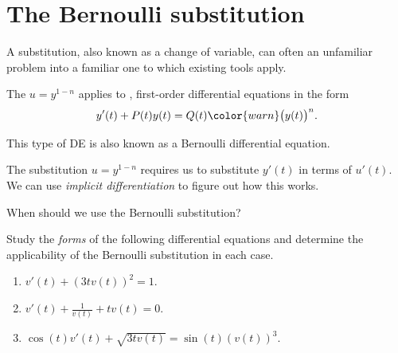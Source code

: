 \documentclass[../main.tex]{subfiles}
\begin{document}
 \section{The Bernoulli substitution}

A substitution, also known as a change of variable, can often  an unfamiliar problem into a familiar one to which existing tools apply. 

\begin{method} \label{method:bernoulli-sub}
  The  \(u = y^{1-n}\) applies to , first-order differential equations  in the form
  \begin{equation} \label{eq:bernoulli}
    y'(t) + P(t) y(t) = Q(t) {\color{warn} \big(y(t)\big)^{n}}.
  \end{equation}

  This type of DE is also known as a Bernoulli differential equation. 
\end{method}
\faStar{} The substitution \(u = y^{1-n}\) requires us to substitute \(y'(t)\) in terms of \(u'(t)\). We can use \emph{implicit differentiation} to figure out how this works.


\begin{example} \label{ex:bernoulli-when-to-use}
  When should we use the Bernoulli substitution?

  Study the \emph{forms} of the following differential equations and determine the applicability of the Bernoulli substitution in each case. 
  
  \begin{enumerate}[wide, label=(\alph*)]
    \item \(v'(t) + (3tv(t))^{2} = 1\).

    \item \(v'(t) + \frac{1}{v(t)} + t v(t) = 0\).

    \item \(\cos(t) v'(t) + \sqrt{3t v(t)} = \sin(t)(v(t))^{3}\).
      \blanks*

  \end{enumerate}
\end{example}
\end{document}
